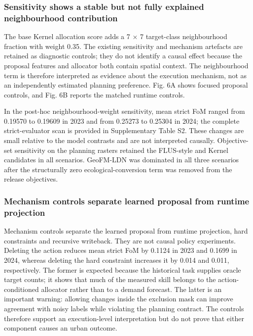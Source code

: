 \subsubsection{Sensitivity shows a stable but not fully explained
neighbourhood
contribution}\label{sensitivity-shows-a-stable-but-not-fully-explained-neighbourhood-contribution}

The base Kernel allocation score adds a 7 × 7 target-class neighbourhood
fraction with weight 0.35. The existing sensitivity and mechanism
artefacts are retained as diagnostic controls; they do not identify a
causal effect because the proposal features and allocator both contain
spatial context. The neighbourhood term is therefore interpreted as
evidence about the execution mechanism, not as an independently
estimated planning preference. Fig. 6A shows focused proposal controls,
and Fig. 6B reports the matched runtime controls.

In the post-hoc neighbourhood-weight sensitivity, mean strict FoM ranged
from 0.19570 to 0.19609 in 2023 and from 0.25273 to 0.25304 in 2024; the
complete strict-evaluator scan is provided in Supplementary Table S2.
These changes are small relative to the model contrasts and are not
interpreted causally. Objective-set sensitivity on the planning rasters
retained the FLUS-style and Kernel candidates in all scenarios.
GeoFM-LDN was dominated in all three scenarios after the structurally
zero ecological-conversion term was removed from the release objectives.

\subsubsection{Mechanism controls separate learned proposal from runtime
projection}\label{mechanism-controls-separate-learned-proposal-from-runtime-projection}

Mechanism controls separate the learned proposal from runtime
projection, hard constraints and recursive writeback. They are not
causal policy experiments. Deleting the action reduces mean strict FoM
by 0.1124 in 2023 and 0.1699 in 2024, whereas deleting the hard
constraint increases it by 0.014 and 0.011, respectively. The former is
expected because the historical task supplies oracle target counts; it
shows that much of the measured skill belongs to the action-conditioned
allocator rather than to a demand forecast. The latter is an important
warning: allowing changes inside the exclusion mask can improve
agreement with noisy labels while violating the planning contract. The
controls therefore support an execution-level interpretation but do not
prove that either component causes an urban outcome.

